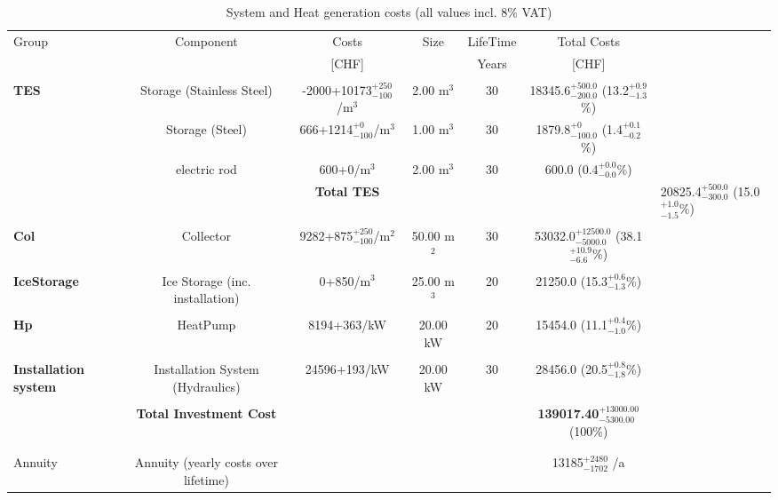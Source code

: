 \documentclass[english]{SPFShortReport}
\begin{document}
\begin{table}[!ht]
\centering
\caption{System and Heat generation costs (all values incl. 8$\%$ VAT) }
\begin{adjustbox}{max width =\textwidth}
\begin{tabular}{l | c c c c c } 
\hline
\hline
Group &Component &Costs &Size &LifeTime &Total Costs \\ 
 & &[CHF] & &Years &[CHF]\\ 
\hline
\\
\textbf{TES} & Storage (Stainless Steel) & -2000+10173$^{\mathrm{+250}}_{\mathrm{-100}}$/m$^3$ & 2.00 m$^3$ & 30 & 18345.6$^{\mathrm{+500.0}}_{\mathrm{-200.0}}$ (13.2$^{\mathrm{+0.9}}_{\mathrm{-1.3}}$\%) \\
 & Storage (Steel) & 666+1214$^{\mathrm{+0}}_{\mathrm{-100}}$/m$^3$ & 1.00 m$^3$ & 30 & 1879.8$^{\mathrm{+0}}_{\mathrm{-100.0}}$ (1.4$^{\mathrm{+0.1}}_{\mathrm{-0.2}}$\%) \\
 & electric rod & 600+0/m$^3$ & 2.00 m$^3$ & 30 & 600.0 (0.4$^{\mathrm{+0.0}}_{\mathrm{-0.0}}$\%) \\
&
 & \textbf{Total TES} & & & & 20825.4$^{\mathrm{+500.0}}_{\mathrm{-300.0}}$ (15.0$^{\mathrm{+1.0}}_{\mathrm{-1.5}}$\%) \\
\hline \\
\textbf{Col} & Collector & 9282+875$^{\mathrm{+250}}_{\mathrm{-100}}$/m$^2$ & 50.00 m$^2$ & 30 & 53032.0$^{\mathrm{+12500.0}}_{\mathrm{-5000.0}}$ (38.1$^{\mathrm{+10.9}}_{\mathrm{-6.6}}$\%) \\
\hline \\
\textbf{IceStorage} & Ice Storage (inc. installation) & 0+850/m$^3$ & 25.00 m$^3$ & 20 & 21250.0 (15.3$^{\mathrm{+0.6}}_{\mathrm{-1.3}}$\%) \\
\hline \\
\textbf{Hp} & HeatPump & 8194+363/kW & 20.00 kW & 20 & 15454.0 (11.1$^{\mathrm{+0.4}}_{\mathrm{-1.0}}$\%) \\
\hline \\
\textbf{Installation system} & Installation System (Hydraulics) & 24596+193/kW & 20.00 kW & 30 & 28456.0 (20.5$^{\mathrm{+0.8}}_{\mathrm{-1.8}}$\%) \\
\hline \\
 & \textbf{Total Investment Cost} & & & & \textbf{139017.40$^{\mathrm{+13000.00}}_{\mathrm{-5300.00}}$} (100\%) \\ 
\hline \\ 
\hline \\ 
Annuity & Annuity (yearly costs over lifetime)  &&& & 13185$^{\mathrm{+2480}}_{\mathrm{-1702}}$ /a  \\

\end{tabular}
\end{adjustbox}
\end{table}
\end{document}
